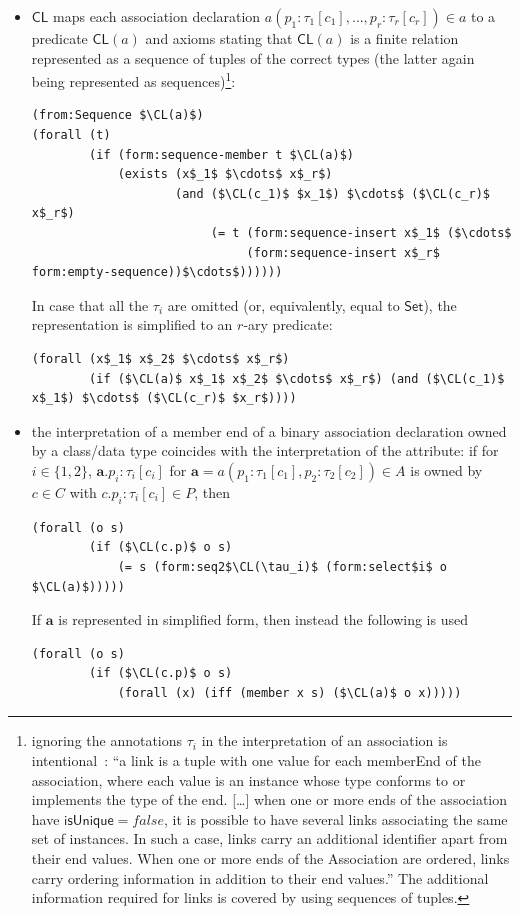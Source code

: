 \documentclass[10pt, a4paper]{isov2}
\newcommand*{\CL}{\ensuremath{\mathsf{CL}}\xspace}
\newcommand{\uml}[1]{\textsf{#1}}
\begin{document}
\begin{itemize} [topsep=0pt, label=--, leftmargin=*]
  \item $\CL$ maps each association declaration
$a(p_1 : \tau_1[c_1], \ldots, p_r : \tau_r[c_r])\in a$
to a predicate $\CL(a)$
and axioms stating that $\CL(a)$
is a finite relation represented as a sequence of tuples of the correct
types (the latter again being represented as
sequences)\footnote{ignoring the annotations $\tau_i$
  in the interpretation of an association is
  intentional~\cite[p.~197]{uml-2.5}: ``a link is a tuple with one value
  for each \uml{memberEnd} of the association, where each value is an
  instance whose type conforms to or implements the type of the end.
  [\ldots] when one or more ends of the association have
  $\uml{isUnique} = \mathit{false}$,
  it is possible to have several links associating the same set of
  instances. In such a case, links carry an additional identifier apart
  from their end values.  When one or more ends of the Association are
  ordered, links carry ordering information in addition to their end
  values.'' The additional information required for links is covered by
  using sequences of tuples.}:
%
\begin{lstlisting}[language=clif, mathescape]
(from:Sequence $\CL(a)$)
(forall (t)
        (if (form:sequence-member t $\CL(a)$)
            (exists (x$_1$ $\cdots$ x$_r$)
                    (and ($\CL(c_1)$ $x_1$) $\cdots$ ($\CL(c_r)$ x$_r$)
                         (= t (form:sequence-insert x$_1$ ($\cdots$
                              (form:sequence-insert x$_r$ form:empty-sequence))$\cdots$))))))
\end{lstlisting}

In case that all the $\tau_i$ are omitted (or, equivalently, equal to 
$\mathsf{Set}$), the representation is simplified to an $r$-ary predicate:
%
\begin{lstlisting}[language=clif, mathescape]
(forall (x$_1$ x$_2$ $\cdots$ x$_r$)
        (if ($\CL(a)$ x$_1$ x$_2$ $\cdots$ x$_r$) (and ($\CL(c_1)$ x$_1$) $\cdots$ ($\CL(c_r)$ $x_r$))))
\end{lstlisting}
%
  \item the interpretation of a member end of a binary association
declaration owned by a class/data type coincides with the interpretation
of the attribute: if for $i\in\{1,2\}$,
$\mathbf{a}.p_i : \tau_i[c_i]$
for $\mathbf{a} = a(p_1 : \tau_1[c_1], p_2 : \tau_2[c_2]) \in A$
is owned by $c \in C$ with $c.p_i : \tau_i[c_i] \in P$, then
%
\begin{lstlisting}[language=clif, mathescape]
(forall (o s)
        (if ($\CL(c.p)$ o s)
            (= s (form:seq2$\CL(\tau_i)$ (form:select$i$ o $\CL(a)$)))))
\end{lstlisting}
%
If $\mathbf{a}$ is represented in simplified form, then instead the
following is used
%
\begin{lstlisting}[language=clif, mathescape]
(forall (o s)
        (if ($\CL(c.p)$ o s)
            (forall (x) (iff (member x s) ($\CL(a)$ o x)))))
\end{lstlisting}


\end{itemize}
\end{document}
